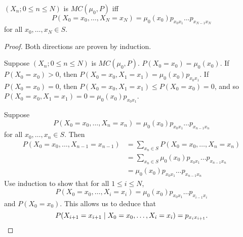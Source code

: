 \begin{theorem}
    $(X_n; 0 \le n \le N)$ is $MC(\mu_0, P)$ iff \[
        P(X_0 = x_0, \dots, X_N = x_N) = \mu_0(x_0) p_{x_0 x_1} \dots p_{x_{N-1} x_N}
    \] for all $x_0, \dots, x_N \in S$.
\end{theorem}
\begin{proof}
    Both directions are proven by induction.

    Suppose $(X_n; 0 \le n \le N)$ is $MC(\mu_0, P)$.
    $P(X_0 = x_0) = \mu_0(x_0)$.
    If $P(X_0 = x_0) > 0$, then
    $P(X_0 = x_0, X_1 = x_1) = \mu_0(x_0) p_{x_0 x_1}$.
    If $P(X_0 = x_0) = 0$, then $P(X_0 = x_0, X_1 = x_1) \le P(X_0 = x_0) = 0$,
    and so $P(X_0 = x_0, X_1 = x_1) = 0 = \mu_0(x_0) p_{x_0 x_1}$.

    Suppose \[
        P(X_0 = x_0, \dots, X_n = x_n)
        = \mu_0(x_0) p_{x_0 x_1} \dots p_{x_{n-1} x_n}
    \]
    for all $x_0, \dots, x_n \in S$.
    Then \begin{align*}
        P(X_0 = x_0, \dots, X_{n-1} = x_{n-1})
            &= \sum_{x_n \in S} P(X_0 = x_0, \dots, X_n = x_n) \\
            &= \sum_{x_n \in S} \mu_0(x_0) p_{x_0 x_1} \dots p_{x_{n-1} x_n} \\
            &= \mu_0(x_0) p_{x_0 x_1} \dots p_{x_{n-1} x_n}
    \end{align*}
    Use induction to show that for all $1 \le i \le N$, \[
        P(X_0 = x_0, \dots, X_i = x_i)
        = \mu_0(x_0) p_{x_0 x_1} \dots p_{x_{i-1} x_i}
    \] and $P(X_0 = x_0)$.
    This allows us to deduce that \[
        P(X_{i+1} = x_{i+1} \mid X_0 = x_0, \dots, X_i = x_i)
        = p_{x_i x_{i+1}}. \qedhere
    \]
\end{proof}


